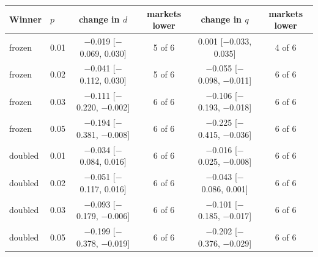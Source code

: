 \begin{tabular}{llcccc}
\toprule
Winner & $p$ & change in $d$ & markets lower & change in $q$ & markets lower \\
\midrule
frozen & 0.01 & $-$0.019 [$-$0.069, 0.030] & 5 of 6 & 0.001 [$-$0.033, 0.035] & 4 of 6 \\
frozen & 0.02 & $-$0.041 [$-$0.112, 0.030] & 5 of 6 & $-$0.055 [$-$0.098, $-$0.011] & 6 of 6 \\
frozen & 0.03 & $-$0.111 [$-$0.220, $-$0.002] & 6 of 6 & $-$0.106 [$-$0.193, $-$0.018] & 6 of 6 \\
frozen & 0.05 & $-$0.194 [$-$0.381, $-$0.008] & 6 of 6 & $-$0.225 [$-$0.415, $-$0.036] & 6 of 6 \\
doubled & 0.01 & $-$0.034 [$-$0.084, 0.016] & 6 of 6 & $-$0.016 [$-$0.025, $-$0.008] & 6 of 6 \\
doubled & 0.02 & $-$0.051 [$-$0.117, 0.016] & 6 of 6 & $-$0.043 [$-$0.086, 0.001] & 6 of 6 \\
doubled & 0.03 & $-$0.093 [$-$0.179, $-$0.006] & 6 of 6 & $-$0.101 [$-$0.185, $-$0.017] & 6 of 6 \\
doubled & 0.05 & $-$0.199 [$-$0.378, $-$0.019] & 6 of 6 & $-$0.202 [$-$0.376, $-$0.029] & 6 of 6 \\
\bottomrule
\end{tabular}
